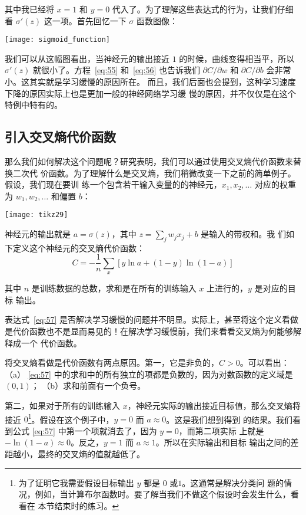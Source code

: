 其中我已经将 $x = 1$ 和 $y = 0$ 代入了。为了理解这些表达式的行为，让我们仔细看
$\sigma'(z)$ 这一项。首先回忆一下 $\sigma$ 函数图像：
\begin{center}
  \texttt{[image: sigmoid\_function]}
\end{center}

我们可以从这幅图看出，当神经元的输出接近 $1$ 的时候，曲线变得相当平，所以
$\sigma'(z)$ 就很小了。方程~\eqref{eq:55} 和~\eqref{eq:56} 也告诉我们 $\partial
C/\partial w$ 和 $\partial C/\partial b$ 会非常小。这其实就是学习缓慢的原因所在。
而且，我们后面也会提到，这种学习速度下降的原因实际上也是更加一般的神经网络学习缓
慢的原因，并不仅仅是在这个特例中特有的。

\subsection{引入交叉熵代价函数}
\label{sec:introducing_the_cross-entropy_cost_function}

那么我们如何解决这个问题呢？研究表明，我们可以通过使用交叉熵代价函数来替换二次代
价函数。为了理解什么是交叉熵，我们稍微改变一下之前的简单例子。假设，我们现在要训
练一个包含若干输入变量的的神经元，$x_1, x_2, \ldots$ 对应的权重为 $w_1, w_2,
\ldots$ 和偏置 $b$：

\begin{center}
  \texttt{[image: tikz29]}
\end{center}

神经元的输出就是 $a = \sigma(z)$，其中 $z = \sum_j w_j x_j+b$ 是输入的带权和。我
们如下定义这个神经元的交叉熵代价函数：
\begin{equation}
  C = -\frac{1}{n} \sum_x \left[y \ln a + (1-y ) \ln (1-a) \right]
\label{eq:57}\tag{57}
\end{equation}

其中 $n$ 是训练数据的总数，求和是在所有的训练输入 $x$ 上进行的，$y$ 是对应的目标
输出。

表达式~\eqref{eq:57} 是否解决学习缓慢的问题并不明显。实际上，甚至将这个定义看做
是代价函数也不是显而易见的！在解决学习缓慢前，我们来看看交叉熵为何能够解释成一个
代价函数。

将交叉熵看做是代价函数有两点原因。第一，它是非负的，$C > 0$。可以看出：（a）
\eqref{eq:57} 中的求和中的所有独立的项都是负数的，因为对数函数的定义域是 $(0,1)$；
      （b）求和前面有一个负号。

第二，如果对于所有的训练输入 $x$，神经元实际的输出接近目标值，那么交叉熵将接近
$0$\footnote{为了证明它我需要假设目标输出 $y$ 都是 $0$ 或$1$。这通常是解决分类问
  题的情况，例如，当计算布尔函数时。要了解当我们不做这个假设时会发生什么，看看在
  本节结束时的练习。}。假设在这个例子中，$y=0$ 而 $a\approx 0$。这是我们想到得到
的结果。我们看到公式 \eqref{eq:57} 中第一个项就消去了，因为 $y=0$，而第二项实际
上就是 $-\ln (1-a)\approx 0$。反之，$y=1$ 而 $a\approx 1$。所以在实际输出和目标
输出之间的差距越小，最终的交叉熵的值就越低了。

